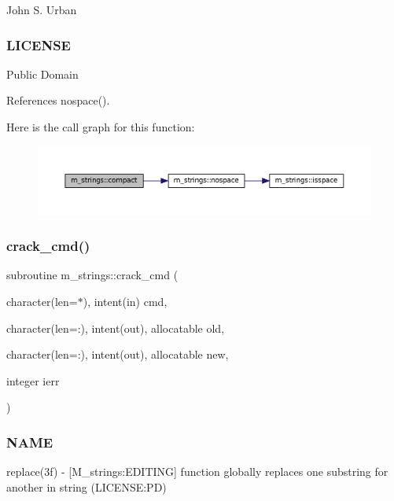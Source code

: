 John S. Urban \subsubsection*{L\+I\+C\+E\+N\+SE}

Public Domain 

References nospace().

Here is the call graph for this function\+:\nopagebreak
\begin{figure}[H]
\begin{center}
\leavevmode
\includegraphics[width=350pt]{namespacem__strings_a929c032267cb990ad4991fab4aed1d57_cgraph}
\end{center}
\end{figure}
\mbox{\label{namespacem__strings_a818d715927dd61c1be6df5d2cdec4e4c}} 
\subsubsection{\texorpdfstring{crack\+\_\+cmd()}{crack\_cmd()}}
{\footnotesize\ttfamily subroutine m\+\_\+strings\+::crack\+\_\+cmd (\begin{DoxyParamCaption}\item[{character(len=$\ast$), intent(in)}]{cmd,  }\item[{character(len=\+:), intent(out), allocatable}]{old,  }\item[{character(len=\+:), intent(out), allocatable}]{new,  }\item[{integer}]{ierr }\end{DoxyParamCaption})\hspace{0.3cm}{\ttfamily [private]}}



\subsubsection*{N\+A\+ME}

replace(3f) -\/ \mbox{[}M\+\_\+strings\+:E\+D\+I\+T\+I\+NG\mbox{]} function globally replaces one substring for another in string (L\+I\+C\+E\+N\+SE\+:PD) 

